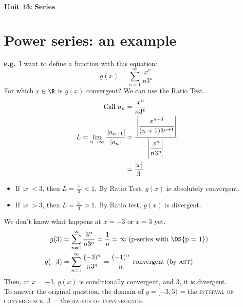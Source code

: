 

\usepackage{blindtext}


\usepackage{subfiles}

\sectionfont{\color{blue}\selectfont}
\subsectionfont{\color{green}\selectfont}

\newcommand{\eg}{\textbf{e.g.}~}
\newcommand{\abs}[1]{\left\lvert #1 \right\rvert}


\newtheorem{theorem}{Theorem}[section]
\newtheorem*{theorem*}{Theorem}
\newtheorem{definition}{Definition}[section]
{\LARGE \textbf{Unit 13: Series}}
\thispagestyle{empty}
\tableofcontents
\newpage
\clearpage
\setcounter{page}{1}
\section{Power series: an example}
\eg I want to define a function with this equation: \[g(x) = \sum_{n = 1}^{\infty} \frac{x^n}{n3^n}\]
For which \(x \in \R\) is \(g(x)\) convergent? We can use the Ratio Test.
\begin{align*}
    \text{Call } a_n                                       & = \frac{x^n}{n3^n}                                                      \\
    L = \lim_{n\to\infty} \cfrac{\abs{a_{n+1}}}{\abs{a_n}} & = \cfrac{\abs{\cfrac{x^{n+1}}{(n+1) 3^{n+1}}}}{\abs{\cfrac{x^n}{n3^n}}} \\
                                                           & = \frac{\abs{x}}{3}
\end{align*}
\begin{itemize}
    \item If \(\abs{x} < 3\), then \(L = \frac{\abs{x}}{3} < 1\). By Ratio Test, \(g(x)\) is absolutely convergent.
    \item If \(\abs{x} > 3\), then \(L = \frac{\abs{x}}{3} > 1\). By Ratio test, \(g(x)\) is divergent.
\end{itemize}
We don't know what happens at \(x = -3\) or \(x = 3\) yet. \\
\begin{align*}
    g(3)  & = \sum_{n = 1}^{\infty} \frac{3^n}{n3^n} = \frac{1}{n}  = \infty \text{ (p-series with \DS{p = 1})} \\
    g(-3) & = \sum_{n = 1}^{\infty} \frac{(-3)^n}{n3^n} = \frac{(-1)^n}{n} \text{ convergent (by \textsc{ast})} \\
\end{align*}
Then, at \(x = -3\), \(g(x)\) is conditionally convergent, and \(3\), it is divergent. \\
To answer the original question, the domain of \(g = [-3, 3)\) = the \textsc{interval of convergence}. \(3\) = the \textsc{radius of convergence}.
\newpage




